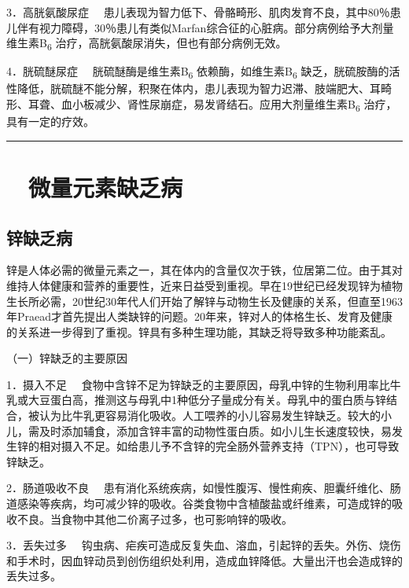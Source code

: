 {3．高胱氨酸尿症}
　患儿表现为智力低下、骨骼畸形、肌肉发育不良，其中80％患儿伴有视力障碍，30％患儿有类似Marfan综合征的心脏病。部分病例给予大剂量维生素B\textsubscript{6}
治疗，高胱氨酸尿消失，但也有部分病例无效。

{4．胱硫醚尿症} 　胱硫醚酶是维生素B\textsubscript{6}
依赖酶，如维生素B\textsubscript{6}
缺乏，胱硫胺酶的活性降低，胱硫醚不能分解，积聚在体内，患儿表现为智力迟滞、肢端肥大、耳畸形、耳聋、血小板减少、肾性尿崩症，易发肾结石。应用大剂量维生素B\textsubscript{6}
治疗，具有一定的疗效。

\begin{center}\rule{0.5\linewidth}{\linethickness}\end{center}

\hypertarget{text00003.htmlux5cux23mllj22}{%
\section{　微量元素缺乏病}\label{text00003.htmlux5cux23mllj22}}

\hypertarget{text00003.htmlux5cux23mllj23}{%
\subsection{锌缺乏病}\label{text00003.htmlux5cux23mllj23}}

锌是人体必需的微量元素之一，其在体内的含量仅次于铁，位居第二位。由于其对维持人体健康和营养的重要性，近来日益受到重视。早在19世纪已经发现锌为植物生长所必需，20世纪30年代人们开始了解锌与动物生长及健康的关系，但直至1963年Praead才首先提出人类缺锌的问题。20年来，锌对人的体格生长、发育及健康的关系进一步得到了重视。锌具有多种生理功能，其缺乏将导致多种功能紊乱。

（一）锌缺乏的主要原因

{1．摄入不足}
　食物中含锌不足为锌缺乏的主要原因，母乳中锌的生物利用率比牛乳或大豆蛋白高，推测这与母乳中1种低分子量成分有关。母乳中的蛋白质与锌结合，被认为比牛乳更容易消化吸收。人工喂养的小儿容易发生锌缺乏。较大的小儿，需及时添加辅食，添加含锌丰富的动物性蛋白质。如小儿生长速度较快，易发生锌的相对摄入不足。如给患儿予不含锌的完全肠外营养支持（TPN），也可导致锌缺乏。

{2．肠道吸收不良}
　患有消化系统疾病，如慢性腹泻、慢性痢疾、胆囊纤维化、肠道感染等疾病，均可减少锌的吸收。谷类食物中含植酸盐或纤维素，可造成锌的吸收不良。当食物中其他二价离子过多，也可影响锌的吸收。

{3．丢失过多}
　钩虫病、疟疾可造成反复失血、溶血，引起锌的丢失。外伤、烧伤和手术时，因血锌动员到创伤组织处利用，造成血锌降低。大量出汗也会造成锌的丢失过多。

